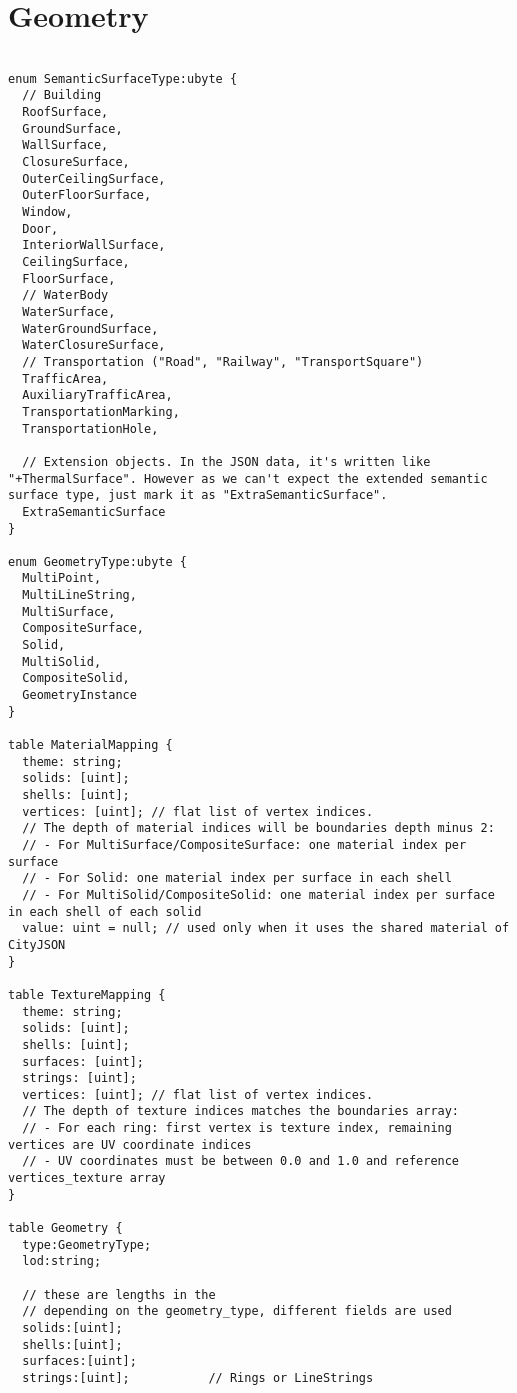 \section{Geometry}
\label{appendix:flatcitybuf_schema:geometry}
\begin{lstlisting}[caption={Geometry schema of FlatCityBuf}, basicstyle=\small]

enum SemanticSurfaceType:ubyte {
  // Building
  RoofSurface,
  GroundSurface,
  WallSurface,
  ClosureSurface,
  OuterCeilingSurface,
  OuterFloorSurface,
  Window,
  Door,
  InteriorWallSurface,
  CeilingSurface,
  FloorSurface,
  // WaterBody
  WaterSurface,
  WaterGroundSurface,
  WaterClosureSurface,
  // Transportation ("Road", "Railway", "TransportSquare")
  TrafficArea,
  AuxiliaryTrafficArea,
  TransportationMarking,
  TransportationHole,

  // Extension objects. In the JSON data, it's written like "+ThermalSurface". However as we can't expect the extended semantic surface type, just mark it as "ExtraSemanticSurface".
  ExtraSemanticSurface
}

enum GeometryType:ubyte {
  MultiPoint,
  MultiLineString,
  MultiSurface,
  CompositeSurface,
  Solid,
  MultiSolid,
  CompositeSolid,
  GeometryInstance
}

table MaterialMapping {
  theme: string;
  solids: [uint];
  shells: [uint];
  vertices: [uint]; // flat list of vertex indices.
  // The depth of material indices will be boundaries depth minus 2:
  // - For MultiSurface/CompositeSurface: one material index per surface
  // - For Solid: one material index per surface in each shell
  // - For MultiSolid/CompositeSolid: one material index per surface in each shell of each solid
  value: uint = null; // used only when it uses the shared material of CityJSON
}

table TextureMapping {
  theme: string;
  solids: [uint];
  shells: [uint];
  surfaces: [uint];
  strings: [uint];
  vertices: [uint]; // flat list of vertex indices.
  // The depth of texture indices matches the boundaries array:
  // - For each ring: first vertex is texture index, remaining vertices are UV coordinate indices
  // - UV coordinates must be between 0.0 and 1.0 and reference vertices_texture array
}

table Geometry {
  type:GeometryType;
  lod:string;

  // these are lengths in the
  // depending on the geometry_type, different fields are used
  solids:[uint];
  shells:[uint];
  surfaces:[uint];
  strings:[uint];           // Rings or LineStrings


\end{lstlisting}
